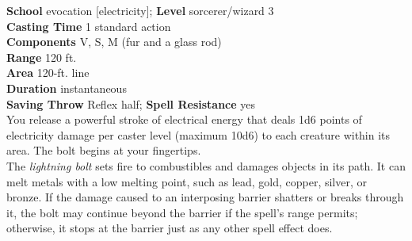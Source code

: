 \textbf{School} evocation [electricity]; \textbf{Level} sorcerer/wizard 3\\
\textbf{Casting Time} 1 standard action\\
\textbf{Components} V, S, M (fur and a glass rod)\\
\textbf{Range} 120 ft.\\
\textbf{Area} 120-ft. line\\
\textbf{Duration} instantaneous\\
\textbf{Saving Throw} Reflex half; \textbf{Spell Resistance} yes\\
You release a powerful stroke of electrical energy that deals 1d6 points of electricity damage per caster level (maximum 10d6) to each creature within its area. The bolt begins at your fingertips.\\
The \textit{lightning bolt }sets fire to combustibles and damages objects in its path. It can melt metals with a low melting point, such as lead, gold, copper, silver, or bronze. If the damage caused to an interposing barrier shatters or breaks through it, the bolt may continue beyond the barrier if the spell's range permits; otherwise, it stops at the barrier just as any other spell effect does.\\
